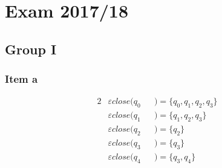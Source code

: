 \setcounter{section}{16}
\section{Exam 2017/18}
{
\renewcommand{\thesubsubsection}{\thesubsection\alph{subsubsection}}
\subsection{Group I}
\subsubsection{Item a}
\begin{alignat*}{2}
	&\varepsilon close(q_0&&)=\{q_0,q_1,q_2,q_3\}\\
	&\varepsilon close(q_1&&)=\{q_1,q_2,q_3\}\\
	&\varepsilon close(q_2&&)=\{q_2\}\\
	&\varepsilon close(q_3&&)=\{q_3\}\\
	&\varepsilon close(q_4&&)=\{q_3,q_4\}
\end{alignat*}
}
